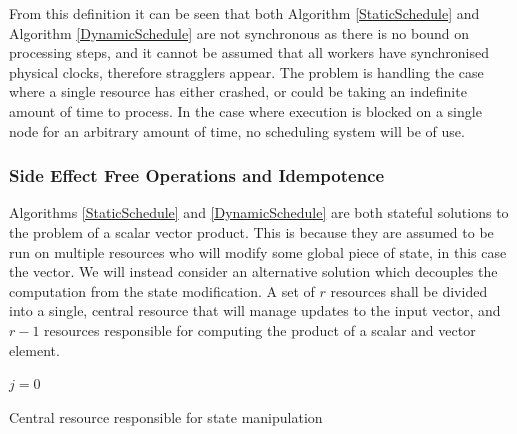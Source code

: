 \documentclass[12pt]{article}
\begin{document}
From this definition it can be seen that both Algorithm \ref{StaticSchedule} and Algorithm \ref{DynamicSchedule} are not synchronous as there is no bound on processing steps, and it cannot be assumed that all workers have synchronised physical clocks, therefore stragglers appear. The problem is handling the case where a single resource has either crashed, or could be taking an indefinite amount of time to process. In the case where execution is blocked on a single node for an arbitrary amount of time, no scheduling system will be of use.

\subsubsection{Side Effect Free Operations and Idempotence}
Algorithms \ref{StaticSchedule} and \ref{DynamicSchedule} are both stateful solutions to the problem of a scalar vector product. This is because they are assumed to be run on multiple resources who will modify some global piece of state, in this case the vector.
\newline
We will instead consider an alternative solution which decouples the computation from the state modification. A set of $r$ resources shall be divided into a single, central resource that will manage updates to the input vector, and $r-1$ resources responsible for computing the product of a scalar and vector element.

\IncMargin{1em}
\begin{algorithm}[H]
 \BlankLine

 $j = 0$\;
 \caption{Central resource responsible for state manipulation}
 \label{StatelessProduct}
\end{algorithm}
\DecMargin{1em}
\medskip
\end{document}

